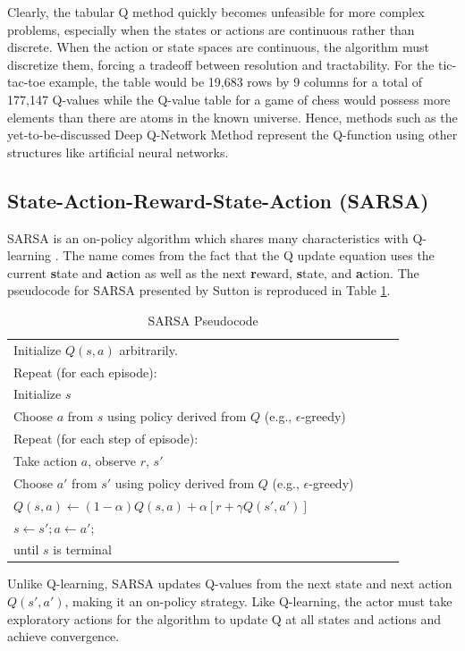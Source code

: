 Clearly, the tabular Q method quickly becomes unfeasible for more complex problems, especially when the states or actions are continuous rather than discrete. When the action or state spaces are continuous, the algorithm must discretize them, forcing a tradeoff between resolution and tractability. For the tic-tac-toe example, the table would be 19,683 rows by 9 columns for a total of 177,147 Q-values while the Q-value table for a game of chess would possess more elements than there are atoms in the known universe. Hence, methods such as the yet-to-be-discussed Deep Q-Network Method represent the Q-function using other structures like artificial neural networks.

\subsection{State-Action-Reward-State-Action (SARSA)}
SARSA is an on-policy algorithm which shares many characteristics with Q-learning \cite{sutton_2017}. The name comes from the fact that the Q update equation uses the current \textbf{s}tate and \textbf{a}ction as well as the next \textbf{r}eward, \textbf{s}tate, and \textbf{a}ction. The pseudocode for SARSA presented by Sutton is reproduced in Table \ref{tab:sarsa}.
\begin{table}[h]
	\caption{SARSA Pseudocode}  \label{tab:sarsa}
	\begin{tabular}{|p{0.9\linewidth}|}\hline %
		Initialize $Q(s,a)$ arbitrarily. \\
		Repeat (for each episode): \\
		\qquad Initialize $s$\\
		\qquad Choose $a$ from $s$ using policy derived from $Q$ (e.g., $\epsilon$-greedy)\\
		\qquad Repeat (for each step of episode):\\
		\qquad \qquad Take action $a$, observe $r$, $s'$\\
		\qquad \qquad Choose $a'$ from $s'$ using policy derived from $Q$ (e.g., $\epsilon$-greedy)\\
		\qquad \qquad $	Q(s,a)\gets (1-\alpha)Q(s,a) + \alpha [r + \gamma Q(s',a')]$\\
		\qquad \qquad $s \gets s'; a \gets a'$;\\
		\qquad until $s$ is terminal \\
		\hline
	\end{tabular}
\end{table}

Unlike Q-learning, SARSA updates Q-values from the next state and next action $Q(s',a')$, making it an on-policy strategy. Like Q-learning, the actor must take exploratory actions for the algorithm to update Q at all states and actions and achieve convergence.

